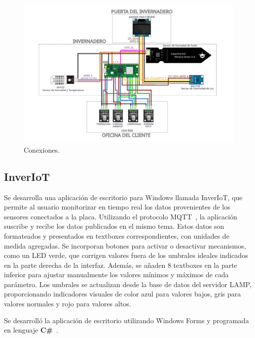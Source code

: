 \begin{figure}[h]
    \centering
    \includegraphics[width=1\textwidth]{img/diagramas/conexiones.png}
    \caption{Conexiones.} \label{Img:conexionesHardware}
\end{figure}
\pagebreak

\subsection{InverIoT}\label{proyecto:InverIoT}
Se desarrolla una aplicación de escritorio para Windows llamada InverIoT, que permite al usuario monitorizar en tiempo real los datos provenientes de los sensores conectados a la placa. Utilizando el protocolo MQTT~\cite{manual:MQTT}, la aplicación suscribe y recibe los datos publicados en el mismo tema. Estos datos son formateados y presentados en textboxes correspondientes, con unidades de medida agregadas. Se incorporan botones para activar o desactivar mecanismos, como un LED verde, que corrigen valores fuera de los umbrales ideales indicados en la parte derecha de la interfaz. Además, se añaden 8 textboxes en la parte inferior para ajustar manualmente los valores mínimos y máximos de cada parámetro. Los umbrales se actualizan desde la base de datos del servidor LAMP, proporcionando indicadores visuales de color azul para valores bajos, gris para valores normales y rojo para valores altos.

Se desarrolló la aplicación de escritorio utilizando Windows Forms y programada en lenguaje \textbf{C\#}~\cite{manual:CSharp}.

